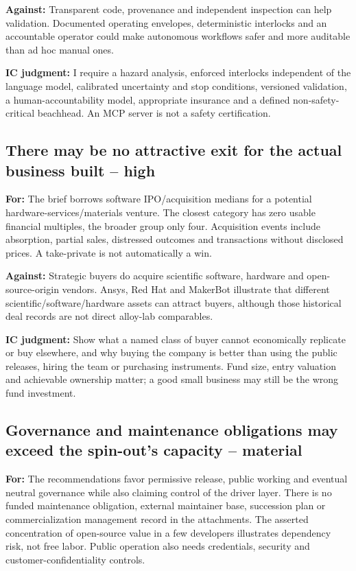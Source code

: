 \documentclass{article}
\begin{document}
\textbf{Against:} Transparent code, provenance and independent
inspection can help validation. Documented operating envelopes,
deterministic interlocks and an accountable operator could make
autonomous workflows safer and more auditable than ad hoc manual ones.

\textbf{IC judgment:} I require a hazard analysis, enforced interlocks
independent of the language model, calibrated uncertainty and stop
conditions, versioned validation, a human-accountability model,
appropriate insurance and a defined non-safety-critical beachhead. An
MCP server is not a safety certification.

\subsection{There may be no attractive exit for the actual business
built --
high}\label{there-may-be-no-attractive-exit-for-the-actual-business-built-high}

\textbf{For:} The brief borrows software IPO/acquisition medians for a
potential hardware-services/materials venture. The closest category has
zero usable financial multiples, the broader group only four.
Acquisition events include absorption, partial sales, distressed
outcomes and transactions without disclosed prices. A take-private is
not automatically a win. \citep{InputData,Boysel2025State}

\textbf{Against:} Strategic buyers do acquire scientific software,
hardware and open-source-origin vendors. Ansys, Red Hat and MakerBot
illustrate that different scientific/software/hardware assets can
attract buyers, although those historical deal records are not direct
alloy-lab comparables.

\textbf{IC judgment:} Show what a named class of buyer cannot
economically replicate or buy elsewhere, and why buying the company is
better than using the public releases, hiring the team or purchasing
instruments. Fund size, entry valuation and achievable ownership matter;
a good small business may still be the wrong fund investment.

\subsection{Governance and maintenance obligations may exceed the
spin-out's capacity --
material}\label{governance-and-maintenance-obligations-may-exceed-the-spin-outs-capacity-material}

\textbf{For:} The recommendations favor permissive release, public
working and eventual neutral governance while also claiming control of
the driver layer. There is no funded maintenance obligation, external
maintainer base, succession plan or commercialization management record
in the attachments. The asserted concentration of open-source value in a
few developers illustrates dependency risk, not free labor. Public
operation also needs credentials, security and customer-confidentiality
controls. \citep{InputRecommendations,Hoffmann2024Value}
\end{document}
